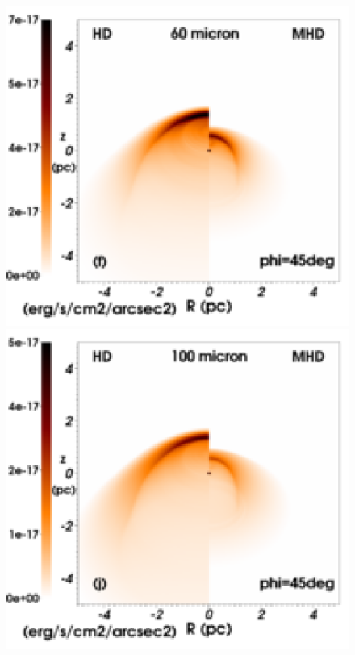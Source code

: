 \documentclass[useAMS,usenatbib]{mn2e}
\begin{document}
\begin{figure}
\begin{minipage}[b]{ 0.32\textwidth}
	\end{minipage}
	\begin{minipage}[b]{ 0.32\textwidth}
			\centering
	        \includegraphics[width=1.0\textwidth]{./map_2040_45deg_lambda60_legend.eps}
	\end{minipage}		
	\begin{minipage}[b]{ 0.32\textwidth}
			\centering
	        \includegraphics[width=1.0\textwidth]{./map_2040_45deg_lambda100_legend.eps}

\end{minipage}
\end{figure}
\end{document}
